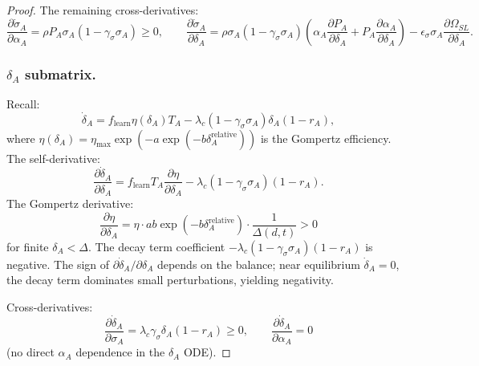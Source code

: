 \begin{proof}
The remaining cross-derivatives:
\[
\frac{\partial \dot{\sigma}_A}{\partial \alpha_A} = \rho P_A \sigma_A (1 - \gamma_\sigma \sigma_A) \geq 0,
\qquad
\frac{\partial \dot{\sigma}_A}{\partial \delta_A} = \rho \sigma_A (1 - \gamma_\sigma \sigma_A)
\left( \alpha_A \frac{\partial P_A}{\partial \delta_A} + P_A \frac{\partial \alpha_A}{\partial \delta_A} \right)
- \epsilon_\sigma \sigma_A \frac{\partial \Omega_{SL}}{\partial \delta_A}.
\]

\subsubsection*{$\delta_A$ submatrix.}
Recall:
\[
\dot{\delta}_A = f_{\text{learn}} \eta(\delta_A) T_A - \lambda_c (1 - \gamma_\sigma \sigma_A) \delta_A (1 - r_A),
\]
where $\eta(\delta_A) = \eta_{\max} \exp(-a \exp(-b \delta_A^{\text{relative}}))$
is the Gompertz efficiency. The self-derivative:
\[
\frac{\partial \dot{\delta}_A}{\partial \delta_A} = f_{\text{learn}} T_A \frac{\partial \eta}{\partial \delta_A}
- \lambda_c (1 - \gamma_\sigma \sigma_A) (1 - r_A).
\]
The Gompertz derivative:
\[
\frac{\partial \eta}{\partial \delta_A} = \eta \cdot a b \exp(-b \delta_A^{\text{relative}}) \cdot \frac{1}{\Delta(d,t)} > 0
\]
for finite $\delta_A < \Delta$. The decay term coefficient
$-\lambda_c (1 - \gamma_\sigma \sigma_A) (1 - r_A)$ is negative. The sign
of $\partial \dot{\delta}_A / \partial \delta_A$ depends on the balance;
near equilibrium $\dot{\delta}_A = 0$, the decay term dominates small
perturbations, yielding negativity.

Cross-derivatives:
\[
\frac{\partial \dot{\delta}_A}{\partial \sigma_A} = \lambda_c \gamma_\sigma \delta_A (1 - r_A) \geq 0,
\qquad
\frac{\partial \dot{\delta}_A}{\partial \alpha_A} = 0
\]
(no direct $\alpha_A$ dependence in the $\delta_A$ ODE).


\end{proof}
